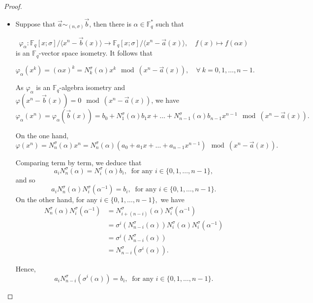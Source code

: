 \documentclass[10pt,a4paper]{amsart}
\newcommand{\Fq}{\mathbb{F}_{q}}
\begin{document}
\begin{proof}\;
\begin{itemize}
    \item[(1) $\Rightarrow$ (2):] 
    Suppose that $ \vec{a} \sim_{(n,\sigma)} \vec{b} $, then there is $\alpha \in \mathbb{F}_q^*$ such that

$$\varphi_{\alpha} : \Fq[x;\sigma] /\langle x^n - \vec{b}(x) \rangle \to \Fq[x;\sigma] /\langle x^n - \vec{a}(x) \rangle, \quad f(x) \mapsto f(\alpha x) $$
is an $\mathbb{F}_q$-vector space isometry.  It follows that

$$ 
\varphi_{\alpha}(x^{k}) = (\alpha x)^k = N^{\sigma}_k(\alpha) x^{k} \mod (x^n - \vec{a}(x)), \quad \forall  \ k = 0, 1, \ldots, n-1.
$$

As $\varphi_{\alpha}$ is an $\mathbb{F}_q$-algebra isometry and $ \varphi(x^n - \vec{b}(x)) = 0 \mod (x^n - \vec{a}(x))$, we have
\begin{equation}
\varphi_{\alpha}(x^n) =\varphi_{\alpha} (\vec{b}(x)) = b_0 + N_1^{\sigma}(\alpha) b_1 x + \ldots + N_{n-1}^{\sigma}(\alpha)b_{n-1} x^{n-1} \mod (x^n - \vec{a}(x)).
\end{equation}

On the one hand,
\begin{equation}
\varphi(x^n) = N^{\sigma}_n(\alpha) x^n = N^{\sigma}_n(\alpha) ( a_0 + a_1 x + \ldots + a_{n-1} x^{n-1}) \mod (x^n - \vec{a}(x)).
\end{equation}

Comparing term by term, we deduce that   
$$ a_i N_{n}^{\sigma}(\alpha) = N_i^{\sigma}(\alpha)b_i, \ \text{ for any }  i \in \{0, 1, \ldots, n-1\},$$ 
and so 
$$ a_i N_{n}^{\sigma}(\alpha)  N_i^{\sigma}(\alpha^{-1}) =b_i, \ \text{ for any }  i \in \{0, 1, \ldots, n-1\}.$$ 
On the other hand, for any $  i \in \{0, 1, \ldots, n-1\} , $ we have 
$$ \begin{array}{rl}
    N_n^{\sigma}(\alpha) N_{i}^{\sigma}(\alpha^{-1})  & =  N_{i+(n-i)}^{\sigma}(\alpha) N_{i}^{\sigma}(\alpha^{-1})\\
     &=   \sigma^{i}(N_{n-i}^{\sigma}(\alpha)) N^{\sigma}_{i}(\alpha) N_{i}^{\sigma}(\alpha^{-1})  \\
     &=  \sigma^{i}(N^{\sigma}_{n-i}(\alpha))\\
     & = N^{\sigma}_{n-i}(\sigma^{i}(\alpha)).
\end{array}
$$

Hence,
$$ a_i N_{n-i}^{\sigma}( \sigma^i(\alpha))  =b_i, \ \text{ for any }  i \in \{0, 1, \ldots, n-1\}.$$ 


\end{itemize}
\end{proof}
\end{document}
